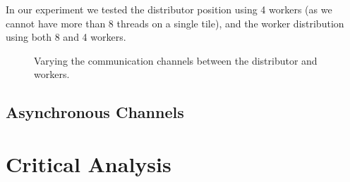\documentclass{article}
\begin{document}
    In our experiment we tested the distributor position using 4 workers (as we cannot have more than 8 threads on a single tile), and the worker distribution using both 8 and 4 workers.

    \begin{figure}[h]
        \begin{center}
            
            
            \caption{Varying the communication channels between the distributor and workers.}
            \label{fig:distribution}
        \end{center}
    \end{figure}

    \subsection{Asynchronous Channels} 
    \label{asyncchannels}

    

    \pagebreak

    \section{Critical Analysis} 
    \label{analysis}
\end{document}
